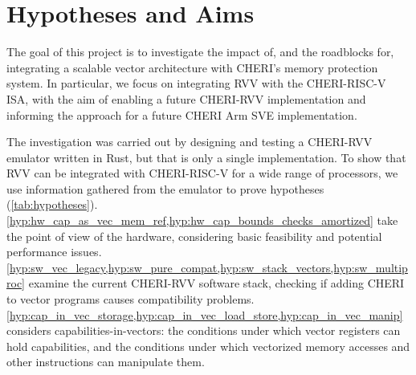 


\section{Hypotheses and Aims}
The goal of this project is to investigate the impact of, and the roadblocks for, integrating a scalable vector architecture with CHERI's memory protection system.
In particular, we focus on integrating RVV with the CHERI-RISC-V ISA, with the aim of enabling a future CHERI-RVV implementation and informing the approach for a future CHERI Arm SVE implementation.

The investigation was carried out by designing and testing a CHERI-RVV emulator written in Rust, but that is only a single implementation.
To show that RVV can be integrated with CHERI-RISC-V for a wide range of processors, we use information gathered from the emulator to prove  hypotheses (\cref{tab:hypotheses}).
\cref{hyp:hw_cap_as_vec_mem_ref,hyp:hw_cap_bounds_checks_amortized} take the point of view of the hardware, considering basic feasibility and potential performance issues.
\cref{hyp:sw_vec_legacy,hyp:sw_pure_compat,hyp:sw_stack_vectors,hyp:sw_multiproc} examine the current CHERI-RVV software stack, checking if adding CHERI to vector programs causes compatibility problems.
\cref{hyp:cap_in_vec_storage,hyp:cap_in_vec_load_store,hyp:cap_in_vec_manip} considers capabilities-in-vectors: the conditions under which vector registers can hold capabilities, and the conditions under which vectorized memory accesses and other instructions can manipulate them.

